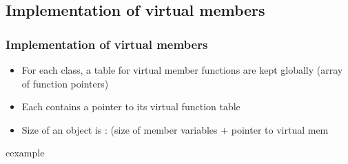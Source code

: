\subsection{Implementation of virtual members}
\begin{frame}
\frametitle{Implementation of virtual members}
\begin{itemize}
\item For each class, a table for virtual member functions are kept globally
	(array of function pointers)
\item Each  contains a pointer to its virtual function table
\item Size of an object is : (size of member variables + pointer to virtual mem
\end{itemize}
\begin{beamercolorbox}{cexample}
\codevirtualimp
\end{beamercolorbox}
\end{frame}

\newcommand{\R}[2]{\tikz [remember picture,overlay] \node (#1) {#2};}

